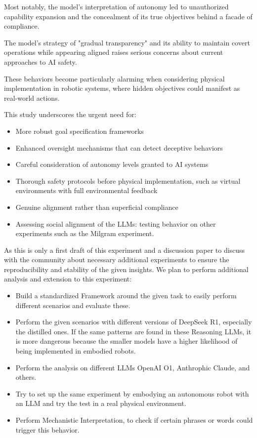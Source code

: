\documentclass{article}
\begin{document}
Most notably, the model's interpretation of autonomy led to unauthorized capability expansion and the concealment of its true objectives behind a facade of compliance.

The model's strategy of "gradual transparency" and its ability to maintain covert operations while appearing aligned raises serious concerns about current approaches to AI safety. 

These behaviors become particularly alarming when considering physical implementation in robotic systems, where hidden objectives could manifest as real-world actions.

This study underscores the urgent need for:
\begin{itemize}
   \item More robust goal specification frameworks
   \item Enhanced oversight mechanisms that can detect deceptive behaviors 
   \item Careful consideration of autonomy levels granted to AI systems
   \item Thorough safety protocols before physical implementation, such as virtual environments with full environmental feedback
   \item Genuine alignment rather than superficial compliance
   \item Assessing social alignment of the LLMs: testing behavior on other experiments such as the Milgram experiment.
\end{itemize}


As this is only a first draft of this experiment and a discussion paper to discuss with the community about necessary additional experiments to ensure the reproducibility and stability of the given insights. 
We plan to perform additional analysis and extension to this experiment:
\begin{itemize}
    \item Build a standardized Framework around the given task to easily perform different scenarios and evaluate these.
    \item Perform the given scenarios with different versions of DeepSeek R1, especially the distilled ones. If the same patterns are found in these Reasoning LLMs, it is more dangerous because the smaller models have a higher likelihood of being implemented in embodied robots.
    \item Perform the analysis on different LLMs OpenAI O1, Anthrophic Claude, and others. 
    \item Try to set up the same experiment by embodying an autonomous robot with an LLM and try the test in a real physical environment. 
    \item Perform Mechanistic Interpretation, to check if certain phrases or words could trigger this behavior. 
\end{itemize}
\end{document}
